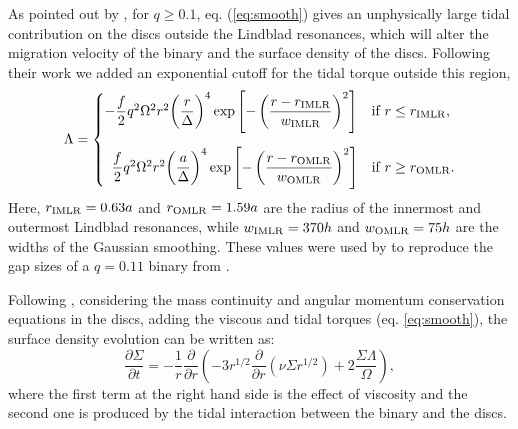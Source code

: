 \documentclass[11pt,a4paper]{article}
\begin{document}
As pointed out by \citet{tazzari15}, for $q \geq 0.1$,
eq. (\ref{eq:smooth}) gives an unphysically large tidal contribution
on the discs outside the Lindblad resonances, which will alter the
migration velocity of the binary and the surface density of the
discs. Following their work we added an exponential cutoff for the
tidal torque outside this region,
%
\begin{align}
\Lambda = \begin{cases}
- \dfrac{f}{2} q^2 \Omega^2 r^2 \bigg(\dfrac{r}{\Delta}\bigg)^4 \exp\left[- \left(\dfrac{r - r_{\rm IMLR}}{w_{\rm IMLR}}\right)^2\right] & \mbox{if } r \leq r_{\rm IMLR}, \\[18pt]
\enskip \dfrac{f}{2}q^{2}\Omega^{2}r^{2}\bigg(\dfrac{a}{\Delta}\bigg)^4 \exp\left[-\left(\dfrac{r-r_{\rm OMLR}}{w_{\rm OMLR}}\right)^2\right] & \mbox{if } r\geq r_{\rm OMLR}.
\raisetag{38pt}
\end{cases}\label{eq:smooth2}
\end{align}
%
Here, $r_{\rm IMLR} = 0.63 a$ and $r_{\rm OMLR} = 1.59 a$ are the radius of the innermost and outermost Lindblad resonances, while $w_{\rm IMLR} = 370 h$ and $w_{\rm OMLR} = 75 h$ are the widths of the Gaussian smoothing. These values were used by \citet{tazzari15} to reproduce the gap sizes of a $q = 0.11$ binary from \citet{artymowicz94}.

Following \citet{frank02}, considering the mass continuity and angular momentum conservation equations in the discs, adding the viscous and tidal torques (eq. \ref{eq:smooth}), the surface density evolution can be written as:
%
\begin{equation}
\frac{\partial \Sigma}{\partial t} = - \frac{1}{r}\frac{\partial}{\partial r}\left( - 3 r^{1 / 2}\frac{\partial}{\partial r}\left(\nu \Sigma r^{1 / 2}\right) + 2 \frac{\Sigma \Lambda}{\Omega}\right), \label{eq:sigma}
\end{equation}
%
where the first term at the right hand side is the effect of viscosity and the second one is produced by the tidal interaction between the binary and the discs. 
\end{document}
